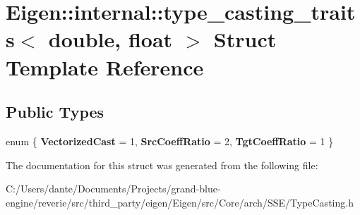 \hypertarget{struct_eigen_1_1internal_1_1type__casting__traits_3_01double_00_01float_01_4}{}\section{Eigen\+::internal\+::type\+\_\+casting\+\_\+traits$<$ double, float $>$ Struct Template Reference}
\label{struct_eigen_1_1internal_1_1type__casting__traits_3_01double_00_01float_01_4}
\subsection*{Public Types}
\begin{DoxyCompactItemize}
\item 
\mbox{\label{struct_eigen_1_1internal_1_1type__casting__traits_3_01double_00_01float_01_4_a8617a90f9413b0bed4be82f7adc5cf4c}} 
enum \{ {\bfseries Vectorized\+Cast} = 1, 
{\bfseries Src\+Coeff\+Ratio} = 2, 
{\bfseries Tgt\+Coeff\+Ratio} = 1
 \}
\end{DoxyCompactItemize}


The documentation for this struct was generated from the following file\+:\begin{DoxyCompactItemize}
\item 
C\+:/\+Users/dante/\+Documents/\+Projects/grand-\/blue-\/engine/reverie/src/third\+\_\+party/eigen/\+Eigen/src/\+Core/arch/\+S\+S\+E/Type\+Casting.\+h\end{DoxyCompactItemize}
